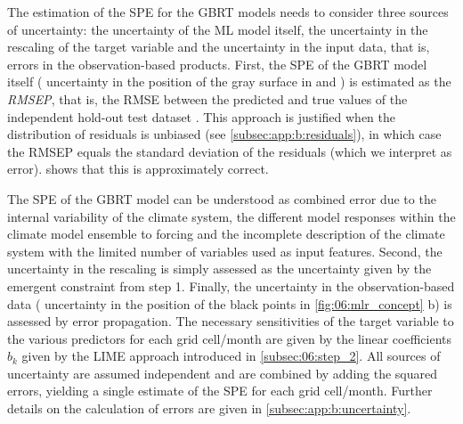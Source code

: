 The estimation of the \acf{SPE} for the \ac{GBRT} models needs to consider
three sources of uncertainty: the uncertainty of the \ac{ML} model itself, the
uncertainty in the rescaling of the target variable and the uncertainty in the
input data, that is, errors in the observation-based products. First, the
\ac{SPE} of the \ac{GBRT} model itself (\ie{} uncertainty in the position of
the gray surface in 
 and
) is estimated as the
\emph{\acf{RMSEP}}, that is, the \ac{RMSE} between the predicted and true
values of the independent hold-out test dataset \autocite{Bishop2006}. This
approach is justified when the distribution of residuals is unbiased (see
\cref{subsec:app:b:residuals}), in which case the \ac{RMSEP} equals the
standard deviation of the residuals (which we interpret as error).
 shows that this is approximately correct.

The \ac{SPE} of the \ac{GBRT} model can be understood as combined error due to
the internal variability of the climate system, the different model responses
within the climate model ensemble to forcing and the incomplete description of
the climate system with the limited number of variables used as input features.
Second, the uncertainty in the rescaling is simply assessed as the uncertainty
given by the emergent constraint from step 1. Finally, the uncertainty in the
observation-based data (\ie{} uncertainty in the position of the black points
in \cref{fig:06:mlr_concept}{\color{BrownRed} b}) is assessed by error
propagation. The necessary sensitivities of the target variable to the various
predictors for each grid cell/month are given by the linear coefficients $b_k$
given by the \ac{LIME} approach introduced in \cref{subsec:06:step_2}. All
sources of uncertainty are assumed independent and are combined by adding the
squared errors, yielding a single estimate of the \ac{SPE} for each grid
cell/month. Further details on the calculation of errors are given in
\cref{subsec:app:b:uncertainty}.

